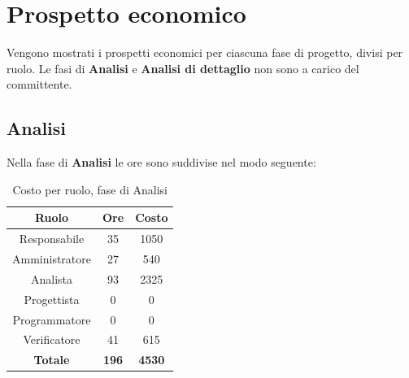 \section{Prospetto economico}
Vengono mostrati i prospetti economici per ciascuna fase di progetto, divisi per ruolo. Le fasi di \textbf{Analisi} e \textbf{Analisi di dettaglio} non sono a carico del committente.

\subsection{Analisi}
Nella fase di \textbf{Analisi} le ore sono suddivise nel modo seguente:
\begin{table}[H]
  \centering
  \begin{tabular}{|c|c|c|}
  \hline
  \textbf{Ruolo} &
  \textbf{Ore} &
  \textbf{Costo} \\
  \hline
  Responsabile & 35 & 1050\\
  \hline
  Amministratore & 27 & 540\\
  \hline
  Analista & 93 & 2325\\
  \hline
  Progettista & 0 & 0 \\
  \hline
  Programmatore & 0 & 0 \\
  \hline
  Verificatore & 41 & 615\\
  \hline
   \textbf{Totale} & \textbf{196} & \textbf{4530} \\
    \hline
  \end{tabular}
  \caption{Costo per ruolo, fase di Analisi}
\end{table}

